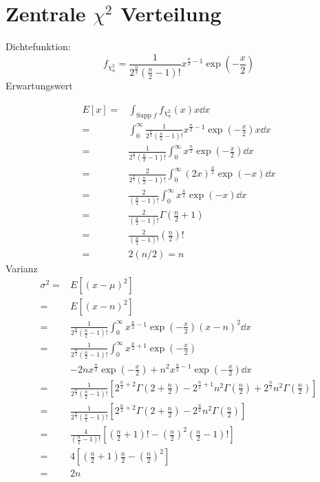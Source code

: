 \documentclass[prb,12pt]{revtex4-2}
\theoremstyle{definition}
\theoremstyle{definition}
\begin{document}
\section{Zentrale $\chi^2$ Verteilung}
Dichtefunktion:
\[f_{\chi^2_n}=\frac{1}{2^{\frac n2}\left(\frac n2-1\right)!}x^{\frac n2 - 1}\exp\left(-\frac x2\right)\]
Erwartungswert

\begin{align*}
	E[x]=& \int_{\text{Supp }f}f_{\chi_n^2}(x) x\dd{x}\\
	=&\int_0^\infty \frac{1}{2^{\frac n2}\left( \frac{n}{2}-1 \right)! }x^{\frac{n}{2}-1}\exp\left( -\frac{x}{2} \right) x\dd{x}\\
	=&\frac{1}{2^{\frac{n}{2}}\left( \frac{n}{2}-1 \right)! }\int_0^\infty x^{\frac{n}{2}}\exp\left( -\frac{x}{2} \right) \dd{x}\\
	=&\frac{2}{2^{\frac{n}{2}}\left( \frac{n}{2}-1 \right)! }\int_0^\infty (2x)^{\frac{n}{2}}\exp\left( -x \right) \dd{x}\\
	=&\frac{2}{\left( \frac{n}{2}-1 \right)! }\int_0^\infty x^{\frac{n}{2}}\exp\left( -x \right) \dd{x}\\
	=&\frac{2}{\left(\frac{n}{2}-1\right)!}\Gamma\left( \frac{n}{2}+1 \right) \\
	=&\frac{2}{\left( \frac{n}{2}-1 \right)!}\left( \frac{n}{2} \right)!\\
	=& 2(n / 2) = n
\end{align*}
Varianz
\begin{align*}
	\sigma^2=& E[(x-\mu)^2]\\
	=&E[(x-n)^2]\\
	=&\frac{1}{2^{\frac{n}{2}}\left( \frac{n}{2}-1 \right)! }\int_0^\infty x^{\frac{n}{2}-1}\exp\left( -\frac{x}{2} \right) (x-n)^2\dd{x}\\
	=&\frac{1}{2^{\frac{n}{2}}\left( \frac{n}{2}-1 \right)!}\int_0^\infty x^{\frac{n}{2}+1}\exp\left( -\frac{x}{2}\right) \\
	&-2nx^{\frac{n}{2}}\exp\left( -\frac{x}{2} \right) +n^2 x^{\frac{n}{2}-1}\exp\left( -\frac{x}{2} \right) \dd{x}\\
	=& \frac{1}{2^{\frac{n}{2}}\left( \frac{n}{2}-1 \right)! }\left[2^{\frac{n}{2}+2}\Gamma\left( 2+\frac{n}{2} \right) -2^{\frac{n}{2}+1}n^2 \Gamma\left( \frac{n}{2} \right) +2^{\frac{n}{2}}n^2\Gamma\left( \frac{n}{2} \right) \right]\\
	=& \frac{1}{2^{\frac{n}{2}}\left( \frac{n}{2}-1 \right)! }\left[2^{\frac{n}{2}+2}\Gamma\left( 2+\frac{n}{2} \right) -2^{\frac{n}{2}}n^2 \Gamma\left( \frac{n}{2} \right)\right]\\
	=&\frac{4}{\left( \frac{n}{2}-1 \right)!} \left[ \left( \frac{n}{2}+1 \right)! - \left( \frac{n}{2} \right)^2 \left( \frac{n}{2}-1 \right)! \right]\\
	=&4\left[ \left( \frac{n}{2}+1 \right) \frac{n}{2}-\left( \frac{n}{2} \right)^2 \right]\\
	=&2n
\end{align*}
\end{document}
